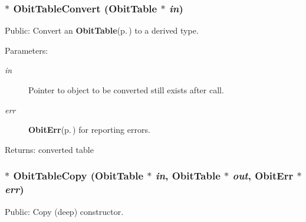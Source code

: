 \subsubsection{$\ast$ Obit\-Table\-Convert ({\bf Obit\-Table} $\ast$ {\em in})}\label{ObitTable_8h_a38}


Public: Convert an {\bf Obit\-Table}{\rm (p.\,\pageref{structObitTable})} to a derived type. 

\begin{Desc}
\item[Parameters:]
\begin{description}
\item[{\em in}]Pointer to object to be converted still exists after call. \item[{\em err}]{\bf Obit\-Err}{\rm (p.\,\pageref{structObitErr})} for reporting errors. \end{description}
\end{Desc}
\begin{Desc}
\item[Returns:]converted table \end{Desc}
\subsubsection{$\ast$ Obit\-Table\-Copy ({\bf Obit\-Table} $\ast$ {\em in}, {\bf Obit\-Table} $\ast$ {\em out}, {\bf Obit\-Err} $\ast$ {\em err})}\label{ObitTable_8h_a35}


Public: Copy (deep) constructor. 

